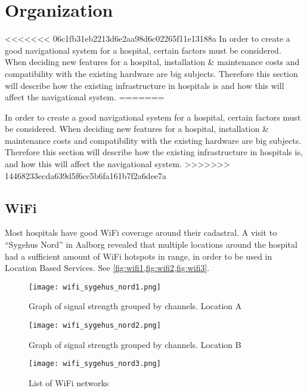 \section{Organization} %
\label{sec:organization}


<<<<<<< 06c1fb31eb2213d6e2aa98d6c02265f11e13188a
In order to create a good navigational system for a hospital, certain factors must be considered. When deciding new features for a hospital, installation \& maintenance costs and compatibility with the existing hardware are big subjects. Therefore this section will describe how the existing infrastructure in hospitals is and how this will affect the navigational system.
=======



In order to create a good navigational system for a hospital, certain factors must be considered. When deciding new features for a hospital, installation \& maintenance costs and compatibility with the existing hardware are big subjects. Therefore this section will describe how the existing infrastructure in hospitals is, and how this will affect the navigational system.
>>>>>>> 14468233ecda639d5f6cc5b6fa161b7f2a6dee7a

\subsection{WiFi}

Most hospitals have good WiFi coverage around their cadastral. A visit to \enquote{Sygehus Nord} in Aalborg revealed that multiple locations around the hospital had a sufficient amount of WiFi hotspots in range, in order to be used in Location Based Services. See \cref{fig:wifi1,fig:wifi2,fig:wifi3}.

\begin{figure}
\centering
  \begin{minipage}{0.45\textwidth}
    \centering
    \texttt{[image: wifi\_sygehus\_nord1.png]}
    \caption{Graph of signal strength grouped by channels. Location A} \label{fig:wifi1}
  \end{minipage}
  \hfill
  \begin{minipage}{0.45\textwidth}
    \centering
    \texttt{[image: wifi\_sygehus\_nord2.png]}
    \caption{Graph of signal strength grouped by channels. Location B} \label{fig:wifi2}
  \end{minipage}
    \begin{minipage}{0.45\textwidth}
    \centering
    \texttt{[image: wifi\_sygehus\_nord3.png]}
    \caption{List of WiFi networks} \label{fig:wifi3}
  \end{minipage}
  \end{figure}


